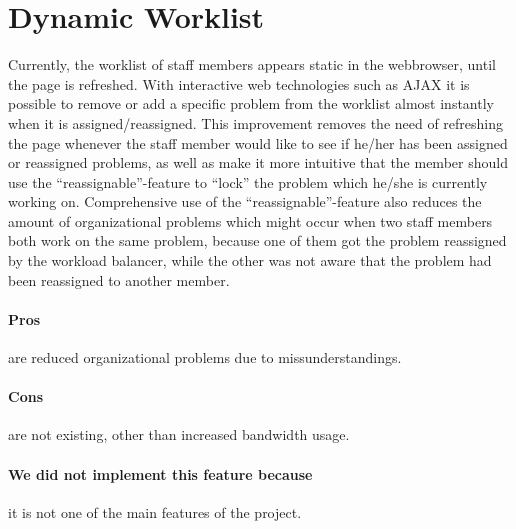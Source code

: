 \section{Dynamic Worklist}
\label{sec:dynamic_worklist}

Currently, the worklist of staff members appears static in the webbrowser, until the page is refreshed. With interactive web technologies such as AJAX it is possible to remove or add a specific problem from the worklist almost instantly when it is assigned/reassigned.
This improvement removes the need of refreshing the page whenever the staff member would like to see if he/her has been assigned or reassigned problems, as well as make it more intuitive that the member should use the ``reassignable''-feature to ``lock'' the problem which he/she is currently working on. Comprehensive use of the ``reassignable''-feature also reduces the amount of organizational problems which might occur when two staff members both work on the same problem, because one of them got the problem reassigned by the workload balancer, while the other was not aware that the problem had been reassigned to another member.

\paragraph{Pros} are reduced organizational problems due to missunderstandings. 
\paragraph{Cons} are not existing, other than increased bandwidth usage.
\paragraph{We did not implement this feature because} it is not one of the main features of the project.